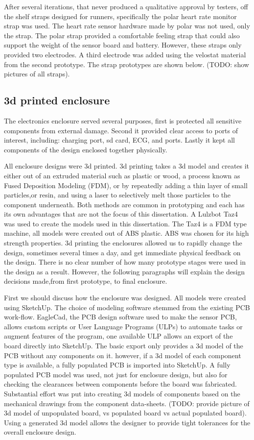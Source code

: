 After several iterations, that never produced a qualitative approval by testers, off the shelf straps designed for runners, specifically the polar heart rate monitor strap was used. The heart rate sensor hardware made by polar was not used, only the strap. The polar strap provided a comfortable feeling strap that could also support the weight of the sensor board and battery. However, these straps only provided two electrodes. A third electrode was added using the velostat material from the second prototype. The strap prototypes are shown below. (TODO: show pictures of all straps).

\subsection {3d printed enclosure}
The electronics enclosure served several purposes, first is protected all sensitive components from external damage. Second it provided clear access to ports of interest, including: charging port, sd card, ECG, and  ports. Lastly it kept all components of the design enclosed together physically. 

All enclosure designs were 3d printed. 3d printing takes a 3d model and creates it either out of an extruded material such as plastic or wood, a process known as Fused Deposition Modeling (FDM), or by repeatedly adding a thin layer of small particles,or resin, and using a laser to selectively melt those particles to the component underneath. Both methods are common in prototyping and each has its own advantages that are not the focus of this dissertation. A Lulzbot Taz4 was used to create the models used in this dissertation. The Taz4 is a FDM type machine, all models were created out of ABS plastic. ABS was chosen for its high strength properties. 3d printing the enclosures allowed us to rapidly change the design, sometimes several times a day, and get immediate physical feedback on the design. There is no clear number of how many prototype stages were used in the design as a result. However, the following paragraphs will explain the design decisions made,from first prototype, to final enclosure.

First we should discuss how the enclosure was designed. All models were created using SketchUp. The choice of modeling software stemmed from the existing PCB work-flow. EagleCad, the PCB design software used to make the sensor PCB, allows custom scripts or User Language Programs (ULPs) to automate tasks or augment features of the program, one available ULP allows an export of the board directly into SketchUp. The basic export only provides a 3d model of the PCB without any components on it. however, if a 3d model of each component type is available, a fully populated PCB is imported into SketchUp. A fully populated PCB model was used, not just for enclosure design, but also for checking the clearances between components before the board was fabricated. Substantial effort was put into creating 3d models of components based on the mechanical drawings from the component data-sheets. (TODO: provide picture of 3d model of unpopulated board, vs populated board vs actual populated board). Using a generated 3d model allows the designer to provide tight tolerances for the overall enclosure design. 

